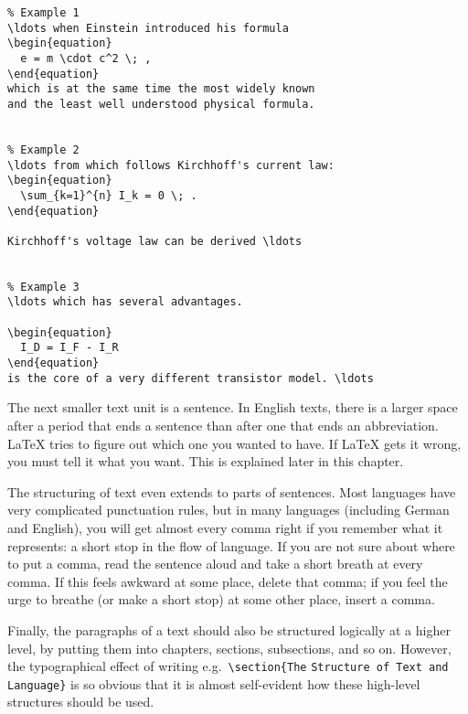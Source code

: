 \begin{code}
\begin{verbatim}
% Example 1
\ldots when Einstein introduced his formula
\begin{equation}
  e = m \cdot c^2 \; ,
\end{equation}
which is at the same time the most widely known
and the least well understood physical formula.


% Example 2
\ldots from which follows Kirchhoff's current law:
\begin{equation}
  \sum_{k=1}^{n} I_k = 0 \; .
\end{equation}

Kirchhoff's voltage law can be derived \ldots


% Example 3
\ldots which has several advantages.

\begin{equation}
  I_D = I_F - I_R
\end{equation}
is the core of a very different transistor model. \ldots
\end{verbatim}
\end{code}

The next smaller text unit is a sentence.  In English texts, there is
a larger space after a period that ends a sentence than after one
that ends an abbreviation.  \LaTeX{} tries to figure out which one
you wanted to have.  If \LaTeX{} gets it wrong, you must tell it what
you want.  This is explained later in this chapter.

The structuring of text even extends to parts of sentences.  Most
languages have very complicated punctuation rules, but in many
languages (including German and English), you will get almost every
comma right if you remember what it represents: a short stop in the
flow of language.  If you are not sure about where to put a comma,
read the sentence aloud and take a short breath at every comma.  If
this feels awkward at some place, delete that comma; if you feel the
urge to breathe (or make a short stop) at some other place, insert a
comma.

Finally, the paragraphs of a text should also be structured logically
at a higher level, by putting them into chapters, sections,
subsections, and so on.  However, the typographical effect of writing
e.g.\ \verb|\section{The| \texttt{Structure of Text and Language}\verb|}| is
so obvious that it is almost self-evident how these high-level
structures should be used.

